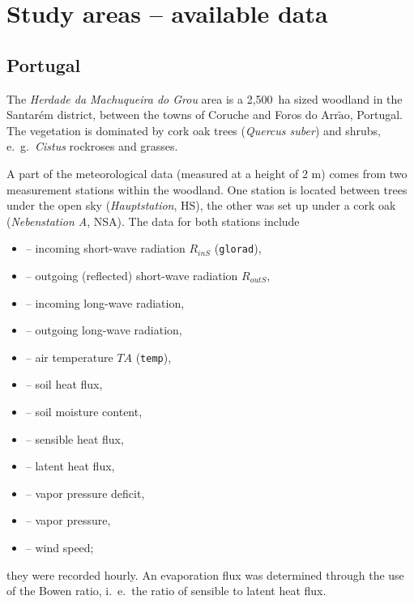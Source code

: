 \documentclass{scrreprt}
\newenvironment{denseitem}{
  \begin{itemize}
    \setlength{\itemsep}{0pt}
    \setlength{\parskip}{0pt}
    \setlength{\parsep}{0pt}
}{
  \end{itemize}
}
\begin{document}
\newpage
\section{Study areas -- available data} \label{sec:intro_areas}

\subsection{Portugal} \label{ssec:intro_areas_portugal}

The \emph{Herdade da Machuqueira do Grou} area is a 2,500~ha sized woodland in the Santar\'em district, between the towns of Coruche and Foros do Arr$\tilde{\text{a}}$o, Portugal.
The vegetation is dominated by cork oak trees (\emph{Quercus suber}) and shrubs, e.\ g.\ \emph{Cistus} rockroses and grasses.

A part of the meteorological data (measured at a height of 2 m) comes from two measurement stations within the woodland.
One station is located between trees under the open sky (\emph{Hauptstation}, HS), the other was set up under a cork oak (\emph{Nebenstation A}, NSA).
The data for both stations include
\begin{denseitem}
  \item[--] incoming short-wave radiation $R_{inS}$ (\verb!glorad!),
  \item[--] outgoing (reflected) short-wave radiation $R_{outS}$,
  \item[--] incoming long-wave radiation,
  \item[--] outgoing long-wave radiation,
  \item[--] air temperature $TA$ (\verb!temp!),
  \item[--] soil heat flux,
  \item[--] soil moisture content,
  \item[--] sensible heat flux,
  \item[--] latent heat flux,
  \item[--] vapor pressure deficit,
  \item[--] vapor pressure,
  \item[--] wind speed;
\end{denseitem}
%
they were recorded hourly.
An evaporation flux was determined through the use of the Bowen ratio, i.\ e.\ the ratio of sensible to latent heat flux.
\end{document}
